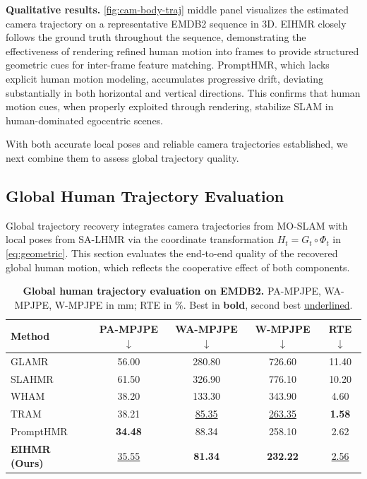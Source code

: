 \noindent\textbf{Qualitative results.}
\cref{fig:cam-body-traj} middle panel visualizes the estimated camera trajectory on a representative EMDB2 sequence in 3D. EIHMR closely follows the ground truth throughout the sequence, demonstrating the effectiveness of rendering refined human motion into frames to provide structured geometric cues for inter-frame feature matching. PromptHMR, which lacks explicit human motion modeling, accumulates progressive drift, deviating substantially in both horizontal and vertical directions. This confirms that human motion cues, when properly exploited through rendering, stabilize SLAM in human-dominated egocentric scenes.

With both accurate local poses and reliable camera trajectories established, we next combine them to assess global trajectory quality.


\subsection{Global Human Trajectory Evaluation}
\label{sec:exp-global}

Global trajectory recovery integrates camera trajectories from MO-SLAM with local poses from SA-LHMR via the coordinate transformation $H_t = G_t \circ \Phi_t$ in \cref{eq:geometric}. This section evaluates the end-to-end quality of the recovered global human motion, which reflects the cooperative effect of both components.

\begin{table}[t]
  \caption{\textbf{Global human trajectory evaluation on EMDB2.} PA-MPJPE, WA-MPJPE, W-MPJPE in mm; RTE in \%. Best in \textbf{bold}, second best \underline{underlined}.}
  \label{tab:global}
  \centering
  \setlength{\tabcolsep}{6pt}
  \begin{tabular}{@{}lcccc@{}}
    \toprule
    Method & PA-MPJPE$\downarrow$ & WA-MPJPE$\downarrow$ & W-MPJPE$\downarrow$ & RTE$\downarrow$ \\
    \midrule
    GLAMR~\cite{GLAMR2022} & 56.00 & 280.80 & 726.60 & 11.40 \\
    SLAHMR~\cite{SLAHMR2023} & 61.50 & 326.90 & 776.10 & 10.20 \\
    WHAM~\cite{WHAM2024} & 38.20 & 133.30 & 343.90 & 4.60 \\
    TRAM~\cite{TRAM2024} & 38.21 & \underline{85.35} & \underline{263.35} & \textbf{1.58} \\
    PromptHMR~\cite{PromptHMR2024} & \textbf{34.48} & 88.34 & 258.10 & 2.62 \\
    \textbf{EIHMR (Ours)} & \underline{35.55} & \textbf{81.34} & \textbf{232.22} & \underline{2.56} \\
    \bottomrule
  \end{tabular}
\end{table}

